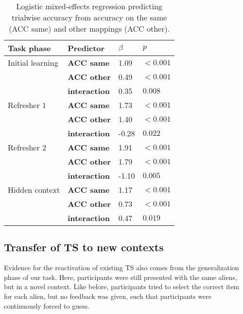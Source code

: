 \documentclass[10pt, letterpaper]{article}
\begin{document}
\begin{table}[!ht]
\begin{center} 
\caption{Logistic mixed-effects regression predicting trialwise accuracy from accuracy on the same (ACC same) and other mappings (ACC other).} 
\label{table:acc self other} 
\vskip 0.1in
\small{
\begin{tabular}{llll} 
\hline
Task phase          &   Predictor           &   $\beta$ &   $p$ \\
\hline
Initial learning    &   {\bf ACC same}      &   1.09    &   $<0.001$ \\
                    &   {\bf ACC other}     &   0.49    &   $<0.001$ \\
                    &   {\bf interaction}   &   0.35    &   $0.008$  \\
Refresher 1         &   {\bf ACC same}      &   1.73    &   $<0.001$ \\
                    &   {\bf ACC other}     &   1.40    &   $<0.001$ \\
                    &   {\bf interaction}   &   -0.28   &   $0.022$  \\
Refresher 2         &   {\bf ACC same}      &   1.91    &   $<0.001$ \\
                    &   {\bf ACC other}     &   1.79    &   $<0.001$ \\
                    &   {\bf interaction}   &   -1.10   &   $0.005$  \\
Hidden context      &   {\bf ACC same}      &   1.17    &   $<0.001$ \\
                    &   {\bf ACC other}     &   0.73    &   $<0.001$ \\
                    &   {\bf interaction}   &   0.47    &   $0.019$  \\
\hline
\end{tabular}
}
\end{center} 
\end{table}


\subsection{Transfer of TS to new contexts}

Evidence for the reactivation of existing TS also comes from the generalization phase of our task. Here, participants were still presented with the same aliens, but in a novel context. Like before, participants tried to select the correct item for each alien, but no feedback was given, such that participants were continuously forced to guess.
\end{document}
